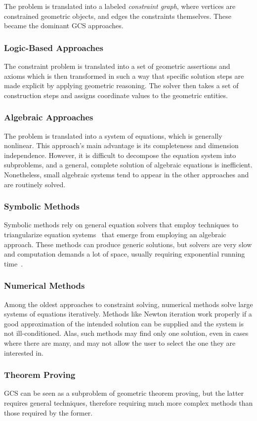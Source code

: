 The problem is translated into a labeled \textit{constraint graph}, where
vertices are constrained geometric objects, and edges the constraints
themselves.  These became the dominant \ac{GCS} approaches.

\subsubsection{Logic-Based Approaches}%
\label{sec:intro.constraints.logic}

The constraint problem is translated into a set of geometric assertions and
axioms which is then transformed in such a way that specific solution steps are
made explicit by applying geometric reasoning.  The solver then takes a set of
construction steps and assigns coordinate values to the geometric entities.

\subsubsection{Algebraic Approaches}%
\label{sec:intro.constraints.algebraic}

The problem is translated into a system of equations, which is generally
nonlinear.  This approach's main advantage is its completeness and dimension
independence.  However, it is difficult to decompose the equation system into
subproblems, and a general, complete solution of algebraic equations is
inefficient.  Nonetheless, small algebraic systems tend to appear in the other
approaches and are routinely solved.

\subsubsection{Symbolic Methods}%
\label{sec:intro.constraints.symbolic}

Symbolic methods rely on general equation solvers that employ techniques to
triangularize equation systems~\cite{Chou:1988:IWMMTPG,Buchberger:1995:Grobner}
that emerge from employing an algebraic approach.  These methods can produce
generic solutions, but solvers are very slow and computation demands a lot of
space, usually requiring exponential running time~\cite{Durand:1998:SNTCS}.

\subsubsection{Numerical Methods}%
\label{sec:intro.constraints.numerical}

Among the oldest approaches to constraint solving, numerical methods solve large
systems of equations iteratively.  Methods like Newton iteration work properly
if a good approximation of the intended solution can be supplied and the system
is not ill-conditioned.  Alas, such methods may find only one solution, even in
cases where there are many, and may not allow the user to select the one they
are interested in.

\subsubsection{Theorem Proving}%
\label{sec:intro.constraints.proving}

\ac{GCS} can be seen as a subproblem of geometric theorem proving, but the
latter requires general techniques, therefore requiring much more complex
methods than those required by the former.
